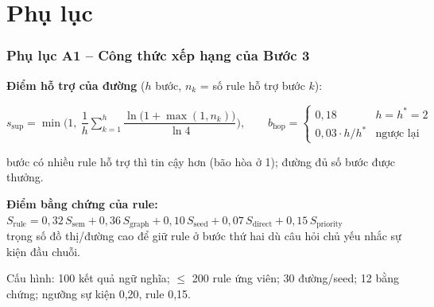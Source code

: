 \section{Phụ lục}

\begin{frame}
\frametitle{Phụ lục A1 -- Công thức xếp hạng của Bước 3}
\footnotesize
\textbf{Điểm hỗ trợ của đường} ($h$ bước, $n_k$ = số rule hỗ trợ bước $k$):\\[2pt]
\centerline{$s_{\text{sup}}=\min\!\Big(1,\ \dfrac{1}{h}\displaystyle\sum_{k=1}^{h}\dfrac{\ln\big(1+\max(1,n_k)\big)}{\ln 4}\Big),\qquad
b_{\text{hop}}=\begin{cases}0{,}18 & h=h^{*}=2\\ 0{,}03\cdot h/h^{*} & \text{ngược lại}\end{cases}$}
\dien bước có nhiều rule hỗ trợ thì tin cậy hơn (bão hòa ở 1); đường đủ số bước được thưởng.

\vspace{0.1cm}
\textbf{Điểm bằng chứng của rule:}\quad
$S_{\text{rule}}=0{,}32\,S_{\text{sem}}+0{,}36\,S_{\text{graph}}+0{,}10\,S_{\text{seed}}
+0{,}07\,S_{\text{direct}}+0{,}15\,S_{\text{priority}}$\\[2pt]
\dien trọng số đồ thị/đường cao để giữ rule ở bước thứ hai dù câu hỏi chủ yếu nhắc sự kiện đầu chuỗi.

\vspace{0.1cm}

\vspace{0.08cm}
Cấu hình: 100 kết quả ngữ nghĩa; $\le$ 200 rule ứng viên; 30 đường/seed; 12 bằng chứng; ngưỡng sự kiện 0,20, rule 0,15.
\end{frame}

